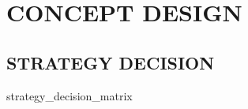 \chapter{CONCEPT DESIGN}\label{chap:concept design}

\section{STRATEGY DECISION}
{strategy_decision_matrix}
